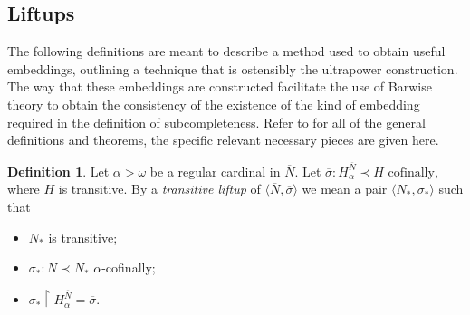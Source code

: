 \documentclass{amsart}
\theoremstyle{definition}
\newtheorem{definition}[theorem]{Definition}
\theoremstyle{remark}
\newcommand{\N}{{\overline{N}}}
\begin{document}
\subsection{Liftups}
\label{subsec:Liftups}
The following definitions are meant to describe a method used to obtain useful embeddings, outlining a technique that is ostensibly the ultrapower construction. The way that these embeddings are constructed facilitate the use of Barwise theory to obtain the consistency of the existence of the kind of embedding required in the definition of subcompleteness. Refer to \cite[Ch.~3]{Jensen:2014} for all of the general definitions and theorems, the specific relevant necessary pieces are given here.
	
\begin{definition} Let $\alpha > \omega$ be a regular cardinal in $\N$. Let 
	$\overline \sigma: H^{\N}_\alpha \prec H \text{ cofinally,}$ where $H$ is transitive. By a \emph{transitive liftup} of $\langle \N, \overline \sigma \rangle$ we mean a pair $\langle N_* , \sigma_* \rangle$ such that 
\begin{itemize} 
	\item $N_*$ is transitive;
	\item $\sigma_*:\N \prec N_*$ $\alpha$-cofinally;
	\item $\sigma_* \upharpoonright H_{\alpha}^{\N}= \overline \sigma$. \qedhere
\end{itemize}	
\end{definition}
\end{document}
